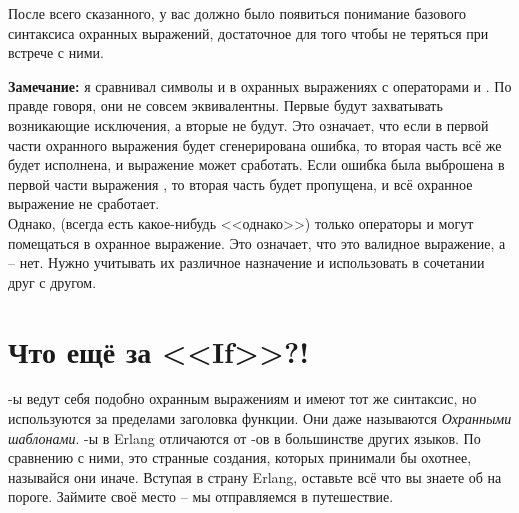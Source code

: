 После всего сказанного, у вас должно было появиться понимание базового синтаксиса охранных выражений, достаточное для того чтобы не теряться при встрече с ними.\\
\colorbox{lgray}
{
    \begin{minipage}{\linewidth}
        \textbf{Замечание:} я сравнивал символы \ops{,} и \ops{;} в охранных выражениях с операторами  и .
        По правде говоря, они не совсем эквивалентны.
        Первые будут захватывать возникающие исключения, а вторые не будут.
        Это означает, что если в первой части охранного выражения  будет сгенерирована ошибка, то вторая часть всё же будет исполнена, и выражение может сработать.
        Если ошибка была выброшена в первой части выражения , то вторая часть будет пропущена, и всё охранное выражение не сработает.\\ 
        Однако, (всегда есть какое\--нибудь <<однако>>) только операторы  и  могут помещаться в охранное выражение.
        Это означает, что  это валидное выражение, а  \--- нет.
        Нужно учитывать их различное назначение и использовать в сочетании друг с другом.
    \end{minipage}
}

\section{Что ещё за <<If>>?!}
\label{what-the-if}
\--ы ведут себя подобно охранным выражениям и имеют тот же синтаксис, но используются за пределами заголовка функции.
Они даже называются \emph{Охранными шаблонами}.
\--ы в Erlang отличаются от \--ов в большинстве других языков.
По сравнению с ними, это странные создания, которых принимали бы охотнее, называйся они иначе.
Вступая в страну Erlang, оставьте всё что вы знаете об  на пороге.
Займите своё место \--- мы отправляемся в путешествие.

